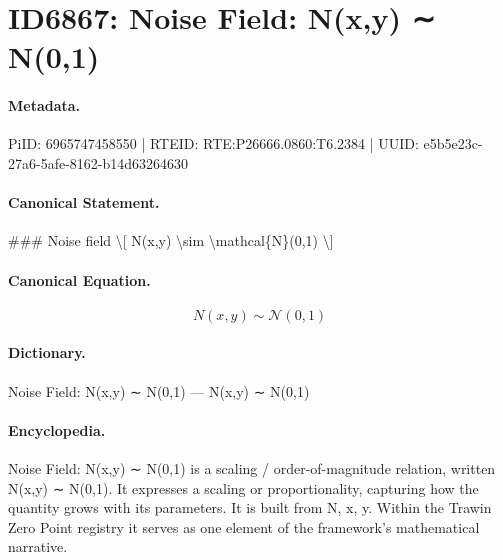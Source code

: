 \section*{ID6867: Noise Field: N(x,y) ∼ N(0,1)}
\paragraph{Metadata.}
PiID: 6965747458550 | RTEID: RTE:P26666.0860:T6.2384 | UUID: e5b5e23c-27a6-5afe-8162-b14d63264630

\paragraph{Canonical Statement.}
\#\#\# Noise field \textbackslash{}[ N(x,y) \textbackslash{}sim \textbackslash{}mathcal\{N\}(0,1) \textbackslash{}]

\paragraph{Canonical Equation.}
\[
N(x,y) \sim \mathcal{N}(0,1)
\]

\paragraph{Dictionary.}
Noise Field: N(x,y) ∼ N(0,1) — N(x,y) ∼ N(0,1)

\paragraph{Encyclopedia.}
Noise Field: N(x,y) ∼ N(0,1) is a scaling / order-of-magnitude relation, written N(x,y) ∼ N(0,1). It expresses a scaling or proportionality, capturing how the quantity grows with its parameters. It is built from N, x, y. Within the Trawin Zero Point registry it serves as one element of the framework's mathematical narrative.
